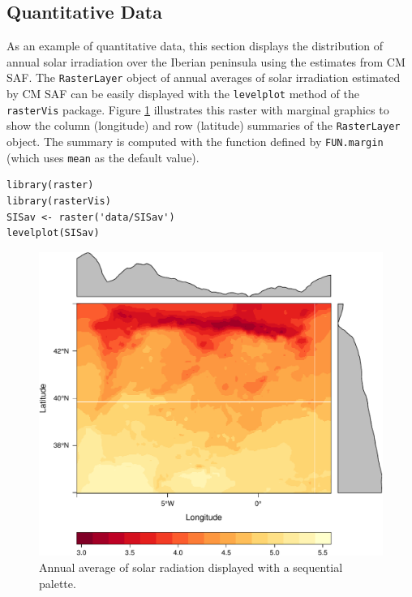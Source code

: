 \documentclass[smallroyalvopaper]{memoir}
\begin{document}
\subsection{Quantitative Data}
\label{sec-1-1}
As an example of quantitative data, this section displays the
distribution of annual solar irradiation over the Iberian peninsula
using the estimates from CM SAF. The \texttt{RasterLayer} object of annual
averages of solar irradiation estimated by CM SAF can be easily
displayed with the \texttt{levelplot} method of the \texttt{rasterVis}
package. Figure \ref{fig:levelplotCMSAF} illustrates this raster with
marginal graphics to show the column (longitude) and row (latitude)
summaries of the \texttt{RasterLayer} object. The summary is computed with
the function defined by \texttt{FUN.margin} (which uses \texttt{mean} as the default
value).


\lstset{language=R,numbers=none}
\begin{lstlisting}
library(raster)
library(rasterVis)
SISav <- raster('data/SISav')
levelplot(SISav)
\end{lstlisting}

\begin{figure}[htb]
\centering
\includegraphics[width=.9\linewidth]{figs/leveplotSISavOrig.pdf}
\caption{\label{fig:levelplotCMSAF}Annual average of solar radiation displayed with a sequential palette.}
\end{figure}
\end{document}
